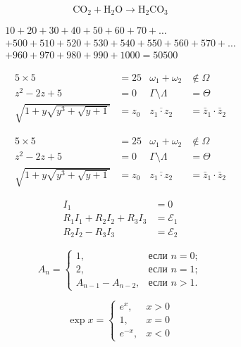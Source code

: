 \documentclass[a4paper,12pt]{article}
\theoremstyle{definition}
\theoremstyle{remark}
\begin{document}
\begin{equation}
  \mathrm{CO}_2 + \mathrm{H}_2\mathrm{O} \to \mathrm{H}_2\mathrm{CO}_3
\end{equation}

\begin{multline}
  10+20+30+40+50+60+70+\dots \\
  +500+510+520+530+540+550+560+570+\dots \\
  +960+970+980+990+1000=50500
\end{multline}

\begin{align}
  5 \times 5 &= 25 & \omega_1 + \omega_2 &\notin \Omega \\
  z^2 - 2z + 5 &= 0 & \Gamma \setminus \Lambda &= \Theta \\
  \sqrt{1+y\sqrt{y^3+\sqrt{y+1}}} &= z_0 & \overline{z_1 \cdot z_2} &= \bar{z}_1 \cdot \bar{z}_2
\end{align}

\begin{equation}
  \begin{aligned}
    5 \times 5 &= 25 & \omega_1 + \omega_2 &\notin \Omega \\
    z^2 - 2z + 5 &= 0 & \Gamma \setminus \Lambda &= \Theta \\
    \sqrt{1+y\sqrt{y^3+\sqrt{y+1}}} &= z_0 & \overline{z_1 \cdot z_2} &= \bar{z}_1 \cdot \bar{z}_2
  \end{aligned}
\end{equation}

\begin{equation}
  \begin{aligned}
    I_1 &= 0 \\
    R_1 I_1 + R_2 I_2 + R_3 I_3 &= \mathcal{E}_1 \\
    R_2 I_2 - R_3 I_3 &= \mathcal{E}_2
  \end{aligned}
\end{equation}

\begin{equation}
  A_n =
  \begin{cases}
    1, & \text{если } n=0; \\
    2, & \text{если } n=1; \\
    A_{n-1} - A_{n-2}, & \text{если } n>1.
  \end{cases}
\end{equation}

\begin{equation}
  \exp x =
  \begin{cases}
    e^x, & x>0 \\
    1, & x=0 \\
    e^{-x}, & x<0
  \end{cases}
\end{equation}
\end{document}
